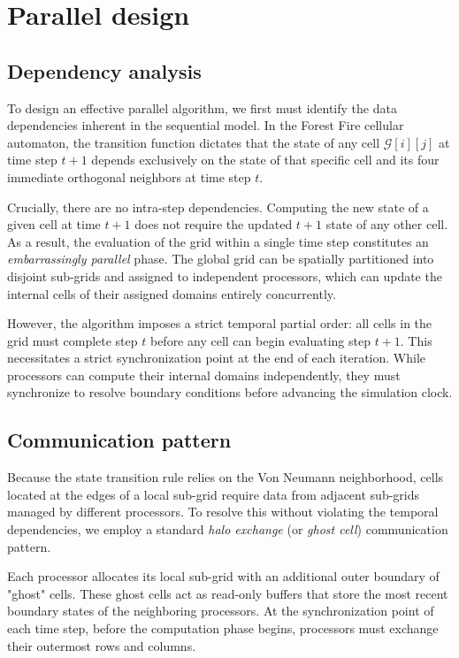 \section{Parallel design}

\subsection{Dependency analysis}
To design an effective parallel algorithm, we first must identify the data dependencies inherent in the sequential model. In the Forest Fire cellular automaton, the transition function dictates that the state of any cell $\mathcal{G}[i][j]$ at time step $t+1$ depends exclusively on the state of that specific cell and its four immediate orthogonal neighbors at time step $t$. 

Crucially, there are no intra-step dependencies. Computing the new state of a given cell at time $t+1$ does not require the updated $t+1$ state of any other cell. As a result, the evaluation of the grid within a single time step constitutes an \textit{embarrassingly parallel} phase. The global grid can be spatially partitioned into disjoint sub-grids and assigned to independent processors, which can update the internal cells of their assigned domains entirely concurrently.

    However, the algorithm imposes a strict temporal partial order: all cells in the grid must complete step $t$ before any cell can begin evaluating step $t+1$. This necessitates a strict synchronization point at the end of each iteration. While processors can compute their internal domains independently, they must synchronize to resolve boundary conditions before advancing the simulation clock.

\subsection{Communication pattern}
Because the state transition rule relies on the Von Neumann neighborhood, cells located at the edges of a local sub-grid require data from adjacent sub-grids managed by different processors. To resolve this without violating the temporal dependencies, we employ a standard \textit{halo exchange} (or \textit{ghost cell}) communication pattern.

Each processor allocates its local sub-grid with an additional outer boundary of "ghost" cells. These ghost cells act as read-only buffers that store the most recent boundary states of the neighboring processors. At the synchronization point of each time step, before the computation phase begins, processors must exchange their outermost rows and columns.

